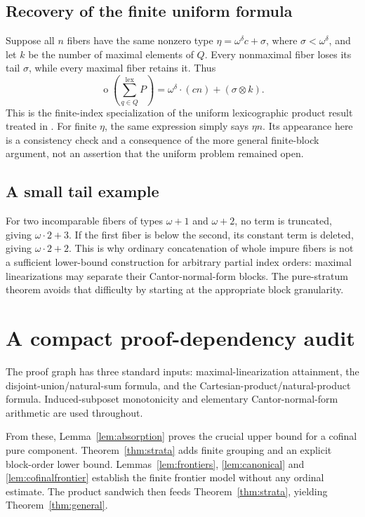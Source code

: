 \documentclass[11pt,a4paper]{article}
\theoremstyle{definition}
\theoremstyle{remark}
\newcommand{\ot}{\operatorname{o}}
\newcommand{\np}{\mathbin{\otimes}}
\newcommand{\lxs}{\mathop{\sum}\limits^{\mathrm{lex}}}
\begin{document}
\subsection{Recovery of the finite uniform formula}

Suppose all $n$ fibers have the same nonzero type
$\eta=\omega^\delta c+\sigma$, where $\sigma<\omega^\delta$, and let $k$
be the number of maximal elements of $Q$. Every nonmaximal fiber loses
its tail $\sigma$, while every maximal fiber retains it. Thus
\[
 \ot\left(\lxs_{q\in Q}P\right)
    =\omega^\delta\cdot(cn)+(\sigma\np k).
\]
This is the finite-index specialization of the uniform lexicographic
product result treated in \cite{Vialard2025}. For finite $\eta$, the same
expression simply says $\eta n$. Its appearance here is a consistency
check and a consequence of the more general finite-block argument, not
an assertion that the uniform problem remained open.

\subsection{A small tail example}

For two incomparable fibers of types $\omega+1$ and $\omega+2$, no term
is truncated, giving $\omega\cdot2+3$. If the first fiber is below the
second, its constant term is deleted, giving $\omega\cdot2+2$.
This is why ordinary concatenation of whole impure fibers is not a
sufficient lower-bound construction for arbitrary partial index orders:
maximal linearizations may separate their Cantor-normal-form blocks.
The pure-stratum theorem avoids that difficulty by starting at the
appropriate block granularity.

\section{A compact proof-dependency audit}\label{sec:audit}

The proof graph has three standard inputs: maximal-linearization
attainment, the disjoint-union/natural-sum formula, and the
Cartesian-product/natural-product formula. Induced-subposet monotonicity
and elementary Cantor-normal-form arithmetic are used throughout.

From these, Lemma~\ref{lem:absorption} proves the crucial upper bound for a
cofinal pure component. Theorem~\ref{thm:strata} adds finite grouping and
an explicit block-order lower bound. Lemmas~\ref{lem:frontiers},
\ref{lem:canonical} and \ref{lem:cofinalfrontier} establish the finite
frontier model without any ordinal estimate. The product sandwich then
feeds Theorem~\ref{thm:strata}, yielding Theorem~\ref{thm:general}.
\end{document}
